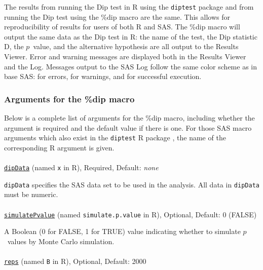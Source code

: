 \documentclass[]{interact}
\theoremstyle{plain}%
\theoremstyle{definition}
\theoremstyle{remark}
\begin{document}

The results from running the Dip test in R using the \texttt{diptest} package and from running the Dip test using the \%dip macro are the same. This allows for reproducibility of results for users of both R and SAS. The \%dip macro will output the same data as the Dip test in R: the name of the test, the Dip statistic D, the $p$~value, and the alternative hypothesis are all output to the Results Viewer. Error and warning messages are displayed both in the Results Viewer and the Log. %
Messages output to the SAS Log follow the same color scheme as in base SAS: {\color{red}{red}} for errors, {\color{warninggreen}{green}} for warnings, and {\color{blue}{blue}} for successful execution.

\subsubsection{Arguments for the \%dip macro}\label{dip:args}
Below is a complete list of arguments for the \%dip macro, including whether the argument is required and the default value if there is one. For those SAS macro arguments which also exist in the \texttt{diptest} R package \cite{diptestpackage}, the name of the corresponding R argument is given.

\paragraph*{}
\texttt{\underline{dipData}} (named \texttt{x} in R), Required, Default: \textit{none}

\texttt{dipData} specifies the SAS data set to be used in the analysis. All data in \texttt{dipData} must be numeric.

\paragraph*{}
\texttt{\underline{simulatePvalue}} (named \texttt{simulate.p.value} in R), Optional, Default: 0 (FALSE)

A Boolean (0 for FALSE, 1 for TRUE) value indicating whether to simulate $p$~values by Monte Carlo simulation. 

\paragraph*{}
\texttt{\underline{reps}} (named \texttt{B} in R), Optional, Default: 2000
\end{document}

